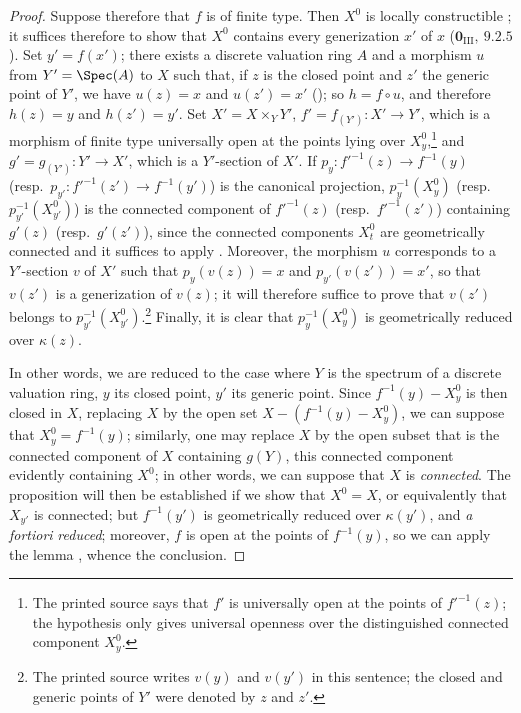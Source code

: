 \begin{proof}
Suppose therefore that $f$ is of finite type.
Then $X^0$ is locally constructible ; it suffices therefore to show that $X^0$ contains every generization $x'$ of $x$ ($\mathbf{0}_{\mathrm{III}},~9.2.5$).
Set $y'=f(x')$; there exists a discrete valuation ring $A$ and a morphism $u$ from $Y'=\Spec(A)$ to $X$ such that, if $z$ is the closed point and $z'$ the generic point of $Y'$, we have $u(z)=x$ and $u(z')=x'$ (); so $h=f\circ u$, and therefore $h(z)=y$ and $h(z')=y'$.
Set $X'=X\times_Y Y'$, $f'=f_{(Y')}:X'\to Y'$, which is a morphism of finite type universally open at the points lying over $X_y^0$,\footnote{The printed source says that $f'$ is universally open at the points of $f'^{-1}(z)$; the hypothesis only gives universal openness over the distinguished connected component $X_y^0$.} and $g'=g_{(Y')}:Y'\to X'$, which is a $Y'$-section of $X'$.
If $p_y:f'^{-1}(z)\to f^{-1}(y)$ (resp.\ $p_{y'}:f'^{-1}(z')\to f^{-1}(y')$) is the canonical projection, $p_y^{-1}(X_y^0)$ (resp.\ $p_{y'}^{-1}(X_{y'}^0)$) is the connected component of $f'^{-1}(z)$ (resp.\ $f'^{-1}(z')$) containing $g'(z)$ (resp.\ $g'(z')$), since the connected components $X_t^0$ are geometrically connected  and it suffices to apply .
Moreover, the morphism $u$ corresponds to a $Y'$-section $v$ of $X'$ such that $p_y(v(z))=x$ and $p_{y'}(v(z'))=x'$, so that $v(z')$ is a generization of $v(z)$; it will therefore suffice to prove that $v(z')$ belongs to $p_{y'}^{-1}(X_{y'}^0)$.\footnote{The printed source writes $v(y)$ and $v(y')$ in this sentence; the closed and generic points of $Y'$ were denoted by $z$ and $z'$.}
Finally, it is clear that $p_y^{-1}(X_y^0)$ is geometrically reduced over $\kappa(z)$.

In other words, we are reduced to the case where $Y$ is the spectrum of a discrete valuation ring, $y$ its closed point, $y'$ its generic point.
Since $f^{-1}(y)-X_y^0$ is then closed in $X$, replacing $X$ by the open set $X-(f^{-1}(y)-X_y^0)$, we can suppose that $X_y^0=f^{-1}(y)$; similarly, one may replace $X$ by the open subset that is the connected component of $X$ containing $g(Y)$, this connected component evidently containing $X^0$; in other words, we can suppose that $X$ is \emph{connected}.
The proposition will then be established if we show that $X^0=X$, or equivalently that $X_{y'}$ is connected; but $f^{-1}(y')$ is geometrically reduced over $\kappa(y')$, and \emph{a fortiori} \emph{reduced}; moreover, $f$ is open at the points of $f^{-1}(y)$, so we can apply the lemma , whence the conclusion.
\end{proof}

